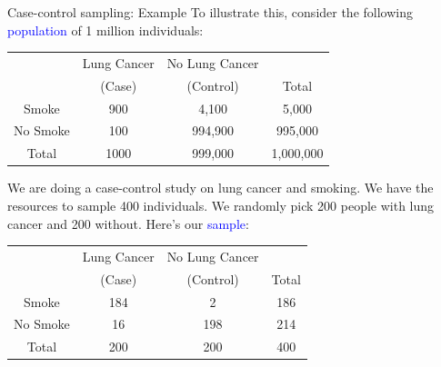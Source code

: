 \documentclass[10pt,t]{beamer}
\begin{document}
\begin{frame}{Case-control sampling: Example}
	\vspace{-0.3cm}
	To illustrate this, consider the following \textcolor{blue}{population} of 1 million individuals:
	\begin{center}
		\begin{table}
			\begin{tabular}{|c|cc|c|}
				\hline 
				& Lung Cancer & No Lung Cancer &  \\ 
				& (Case) & (Control) & Total  \\
				\hline 
				Smoke & 900 & 4,100  & 5,000 \\ 
				No Smoke & 100 & 994,900 & 995,000  \\ 
				\hline 
				Total & 1000 & 999,000 & 1,000,000 \\ 
				\hline 
			\end{tabular}
		\end{table}
	\end{center}\pause
	We are doing a case-control study on lung cancer and smoking. We have the resources to sample 400 individuals. We randomly pick 200 people with lung cancer and 200 without. Here's our \textcolor{blue}{sample}:
		\begin{center}
		\begin{table}
			\begin{tabular}{|c|cc|c|}
				\hline 
				& Lung Cancer & No Lung Cancer &  \\ 
				& (Case) & (Control) & Total  \\
				\hline 
				Smoke & 184 & 2  & 186 \\ 
				No Smoke & 16 & 198 & 214  \\ 
				\hline 
				Total & 200 & 200 & 400 \\ 
				\hline 
			\end{tabular}
		\end{table}
	\end{center}
\end{frame}
\end{document}
